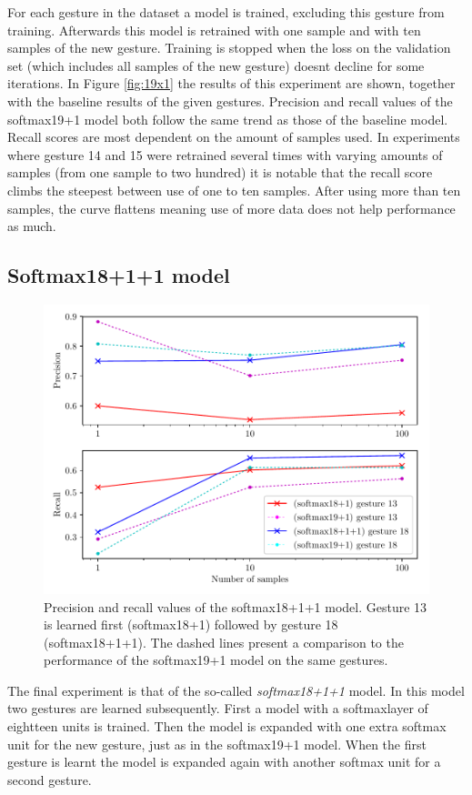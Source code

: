 \documentclass[twocolumn]{phdsymp} %
\begin{document}
For each gesture in the dataset a model is trained, excluding this gesture from training. Afterwards this model is retrained with one sample and with ten samples of the new gesture. Training is stopped when the loss on the validation set (which includes all samples of the new gesture) doesnt decline for some iterations. In Figure \ref{fig:19x1} the results of this experiment are shown, together with the baseline results of the given gestures. Precision and recall values of the softmax19+1 model both follow the same trend as those of the baseline model. Recall scores are most dependent on the amount of samples used.
In experiments where gesture 14 and 15 were retrained several times with varying amounts of samples (from one sample to two hundred) it is notable that the recall score climbs the steepest between use of one to ten samples. After using more than ten samples, the curve flattens meaning use of more data does not help performance as much.

\subsection{Softmax18+1+1 model}
\begin{figure}
	\includegraphics[width=\columnwidth]{18x2.pdf}
	\caption{Precision and recall values of the softmax18+1+1 model. Gesture 13 is learned first (softmax18+1) followed by gesture 18 (softmax18+1+1). The dashed lines present a comparison to the performance of the softmax19+1 model on the same gestures.}\label{fig:18x2}
\end{figure}
The final experiment is that of the so-called \textit{softmax18+1+1} model. In this model two gestures are learned subsequently. First a model with a softmaxlayer of eightteen units is trained. Then the model is expanded with one extra softmax unit for the new gesture, just as in the softmax19+1 model. When the first gesture is learnt the model is expanded again with another softmax unit for a second gesture.
\end{document}
